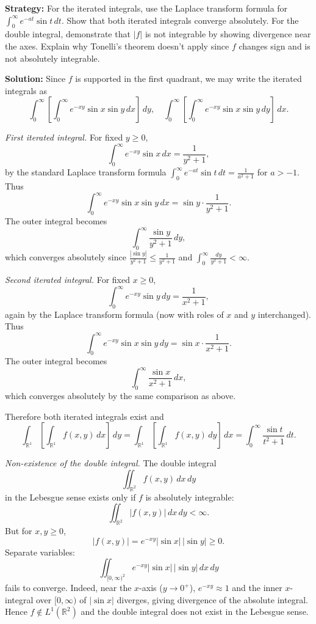 \noindent\textbf{Strategy:} For the iterated integrals, use the Laplace transform formula for \(\int_0^\infty e^{-at} \sin t \, dt\). Show that both iterated integrals converge absolutely. For the double integral, demonstrate that \(|f|\) is not integrable by showing divergence near the axes. Explain why Tonelli's theorem doesn't apply since \(f\) changes sign and is not absolutely integrable.

\bigskip\noindent\textbf{Solution:}
Since \(f\) is supported in the first quadrant, we may write the iterated integrals as
\[
\int_0^\infty \left[ \int_0^\infty e^{-xy} \sin x \sin y \, dx \right] \, dy,
\quad
\int_0^\infty \left[ \int_0^\infty e^{-xy} \sin x \sin y \, dy \right] \, dx.
\]

\emph{First iterated integral.}
For fixed \(y \ge 0\),
\[
\int_0^\infty e^{-xy} \sin x \, dx
= \frac{1}{y^2+1},
\]
by the standard Laplace transform formula 
\(\int_0^\infty e^{-at} \sin t\, dt = \frac{1}{a^2+1}\) for \(a > -1\).
Thus
\[
\int_0^\infty e^{-xy} \sin x \sin y \, dx
= \sin y \cdot \frac{1}{y^2+1}.
\]
The outer integral becomes
\[
\int_0^\infty \frac{\sin y}{y^2+1} \, dy,
\]
which converges absolutely since \(\frac{|\sin y|}{y^2+1} \le \frac{1}{y^2+1}\) and \(\int_0^\infty \frac{dy}{y^2+1} < \infty\).

\emph{Second iterated integral.}
For fixed \(x \ge 0\),
\[
\int_0^\infty e^{-xy} \sin y \, dy
= \frac{1}{x^2+1},
\]
again by the Laplace transform formula (now with roles of \(x\) and \(y\) interchanged).
Thus
\[
\int_0^\infty e^{-xy} \sin x \sin y \, dy
= \sin x \cdot \frac{1}{x^2+1}.
\]
The outer integral becomes
\[
\int_0^\infty \frac{\sin x}{x^2+1} \, dx,
\]
which converges absolutely by the same comparison as above.  

Therefore both iterated integrals exist and
\[
\int_{\mathbb{R}^1} \left[ \int_{\mathbb{R}^1} f(x, y) \, dx \right] \, dy
=
\int_{\mathbb{R}^1} \left[ \int_{\mathbb{R}^1} f(x, y) \, dy \right] \, dx
= \int_0^\infty \frac{\sin t}{t^2+1} \, dt.
\]

\emph{Non-existence of the double integral.}
The double integral
\[
\iint_{\mathbb{R}^2} f(x,y) \, dx \, dy
\]
in the Lebesgue sense exists only if \(f\) is absolutely integrable:
\[
\iint_{\mathbb{R}^2} |f(x,y)| \, dx \, dy < \infty.
\]
But for \(x,y \ge 0\),
\[
|f(x,y)| = e^{-xy} |\sin x| \, |\sin y| \ge 0.
\]
Separate variables:
\[
\iint_{[0,\infty)^2} e^{-xy} |\sin x|\, |\sin y| \, dx\, dy
\]
fails to converge. Indeed, near the \(x\)-axis (\(y \to 0^+\)), \(e^{-xy} \approx 1\) and the inner \(x\)-integral over \([0,\infty)\) of \(|\sin x|\) diverges, giving divergence of the absolute integral.  
Hence \(f \notin L^1(\mathbb{R}^2)\) and the double integral does not exist in the Lebesgue sense.

